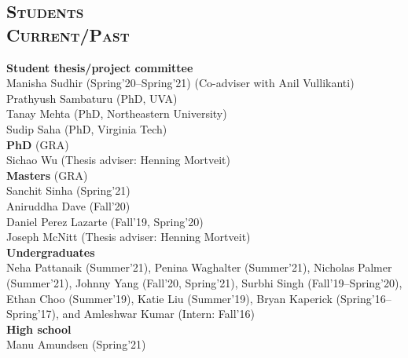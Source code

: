 \documentclass[margin,10pt]{res} %
\begin{document}
\begin{resume}
\section{\textnormal{\textsc{Students \\Current/Past}}}
\noindent\textbf{Student thesis/project committee}\\
Manisha Sudhir (Spring'20--Spring'21) (Co-adviser with Anil
Vullikanti)\\
Prathyush Sambaturu (PhD, UVA) \\
Tanay Mehta (PhD, Northeastern University) \\
Sudip Saha (PhD, Virginia Tech)\vspace{.2cm}\\
\noindent\textbf{PhD} (GRA)\\
Sichao Wu (Thesis adviser: Henning Mortveit)\vspace{.2cm}\\
\noindent\textbf{Masters} (GRA)\\
Sanchit Sinha (Spring'21)\\
Aniruddha Dave (Fall'20)\\
Daniel Perez Lazarte (Fall'19, Spring'20)\\
Joseph McNitt (Thesis adviser: Henning Mortveit)\vspace{.2cm}\\
\noindent\textbf{Undergraduates}\\
Neha Pattanaik (Summer'21),
Penina Waghalter (Summer'21),
Nicholas Palmer (Summer'21),
Johnny Yang (Fall'20, Spring'21),
Surbhi Singh (Fall'19--Spring'20),
Ethan Choo (Summer'19),
Katie Liu (Summer'19),
Bryan Kaperick (Spring'16--Spring'17), and
Amleshwar Kumar (Intern: Fall'16) \vspace{.2cm}\\
\noindent\textbf{High school}\\
Manu Amundsen (Spring'21)

\end{resume}
\end{document}
